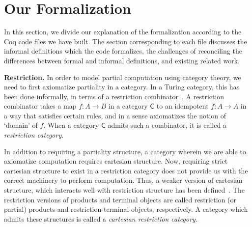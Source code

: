 \documentclass{entcs} \usepackage{entcsmacro}
\begin{document}
\section{Our Formalization}

%

In this section, we divide our explanation of the formalization
according to the Coq code files we have built. The section
corresponding to each file discusses the informal definitions which
the code formalizes, the challenges of reconciling the differences
between formal and informal definitions, and existing related work.

{\bfseries Restriction.} In order to model partial computation using category theory, we need to first axiomatize partiality in a category. In a Turing category, this has been done informally, in terms of a restriction combinator~\cite{Restriction}. A restriction combinator takes a map $f : A \to B$ in a category $\mathsf{C}$ to an idempotent $\overline{f} : A \to A$ in a way that satisfies certain rules, and  in a sense axiomatizes the notion of `domain' of $f$. When a category $\mathsf{C}$ admits such a combinator, it is called a {\em restriction category}. 

In addition to requiring a partiality structure, a category wherein we are able to axiomatize computation requires cartesian structure. Now, requiring strict cartesian structure to exist in a restriction category does not provide us with the correct machinery to perform computation. Thus, a weaker version of cartesian structure, which interacts well with restriction structure has been defined~\cite{Turing}. The restriction versions of products and terminal objects are called restriction (or partial) products and restriction-terminal objects, respectively. A category which admits these structures is called a {\em cartesian restriction category.} 
\end{document}
